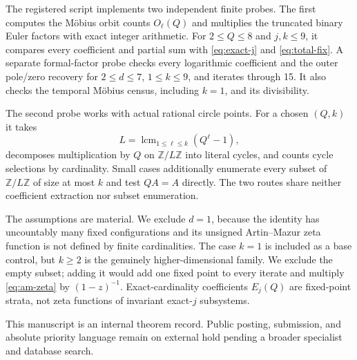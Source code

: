 \documentclass[11pt,a4paper]{amsart}
\theoremstyle{definition}
\theoremstyle{remark}
\begin{document}
The registered script implements two independent finite probes.  The first
computes the M\"obius orbit counts $O_\ell(Q)$ and multiplies the truncated
binary Euler factors with exact integer arithmetic.  For $2\leq Q\leq8$ and
$j,k\leq9$, it compares every coefficient and partial sum with
\eqref{eq:exact-j} and \eqref{eq:total-fix}.  A separate formal-factor probe
checks every logarithmic coefficient and the outer pole/zero recovery for
$2\leq d\leq7$, $1\leq k\leq9$, and iterates through 15.  It also checks the
temporal M\"obius census, including $k=1$, and its divisibility.

The second probe works with actual rational circle points.  For a chosen
$(Q,k)$ it takes
\[
 L=\operatorname{lcm}_{1\leq\ell\leq k}(Q^\ell-1),
\]
decomposes multiplication by $Q$ on $\mathbb Z/L\mathbb Z$ into literal
cycles, and counts cycle selections by cardinality.  Small cases additionally
enumerate every subset of $\mathbb Z/L\mathbb Z$ of size at most $k$ and test
$QA=A$ directly.  The two routes share neither coefficient extraction nor
subset enumeration.

The assumptions are material.  We exclude $d=1$, because the identity has
uncountably many fixed configurations and its unsigned Artin--Mazur zeta
function is not defined by finite cardinalities.  The case $k=1$ is included
as a base control, but $k\geq2$ is the genuinely higher-dimensional family.
We exclude the empty subset; adding it would add one fixed point to every
iterate and multiply \eqref{eq:am-zeta} by $(1-z)^{-1}$.  Exact-cardinality
coefficients $E_j(Q)$ are fixed-point strata, not zeta functions of invariant
exact-$j$ subsystems.

This manuscript is an internal theorem record.  Public posting, submission,
and absolute priority language remain on external hold pending a broader
specialist and database search.



\end{document}
